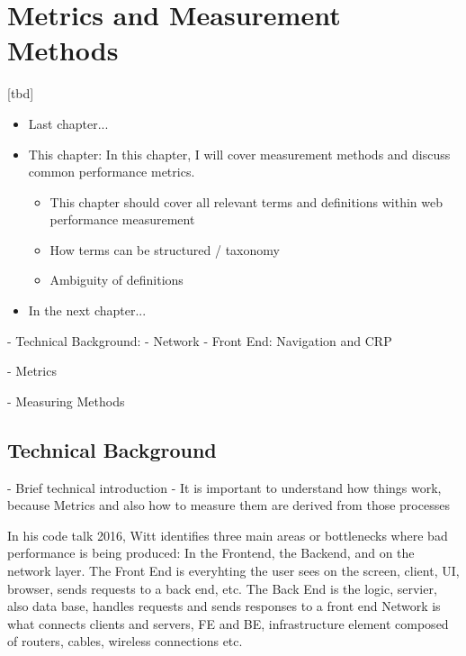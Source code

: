 \chapter{Metrics and Measurement Methods}

[tbd]

\begin{itemize}
	\item Last chapter...
	\item This chapter: In this chapter, I will cover measurement methods and discuss common performance metrics.
	\begin{itemize}
		\item This chapter should cover all relevant terms and definitions within web performance measurement
		\item How terms can be structured / taxonomy
		\item Ambiguity of definitions
	\end{itemize}
	\item In the next chapter...
\end{itemize}


- Technical Background:
	- Network
	- Front End: Navigation and CRP
	
- Metrics

- Measuring Methods







\section{Technical Background}

- Brief technical introduction
- It is important to understand how things work, because Metrics and also how to measure them are derived from those processes


In his code talk 2016, Witt identifies three main areas or bottlenecks where bad performance is being produced: In the Frontend, the Backend, and on the network layer.  %
The Front End is everyhting the user sees on the screen, client, UI, browser, sends requests to a back end, etc.
The Back End is the logic, servier, also data base, handles requests and sends responses to a front end
Network is what connects clients and servers, FE and BE, infrastructure element composed of routers, cables, wireless connections etc.


